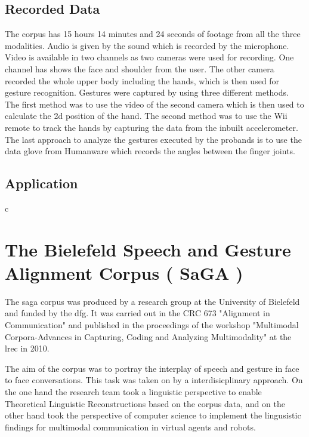 \documentclass[a4paper]{article}
\begin{document}
		\subsection{Recorded Data}
			The corpus has 15 hours 14 minutes and 24 seconds of footage from all the three modalities. Audio is given by the sound which is recorded by the microphone. Video is available in two channels as two cameras were used for recording. One channel has shows the face and shoulder from the user. The other camera recorded the whole upper body including the hands, which is then used for gesture recognition. Gestures were captured by using three different methods. The first method was to use the video of the second camera which is then used to calculate the 2d position of the hand. The second method was to use the Wii remote to track the hands by capturing the data from the inbuilt accelerometer. The last approach to analyze the gestures executed by the probands is to use the data glove from Humanware which records the angles between the finger joints.
		\subsection{Application}
			c
	
	\section{The Bielefeld Speech and Gesture Alignment Corpus ( SaGA )}
		The \gls{saga} corpus was produced by a research group at the University of Bielefeld and funded by the \gls{dfg}. It was carried out in the CRC 673 "Alignment in Communication" and published in the proceedings of the workshop "Multimodal Corpora-Advances in Capturing, Coding and Analyzing Multimodality" at the \gls{lrec} in 2010.
		
		The aim of the corpus was to portray the interplay of speech and gesture in face to face conversations. This task was taken on by a interdisicplinary approach. On the one hand the research team took a linguistic perspective to enable Theoretical Linguistic Reconstructions based on the corpus data, and on the other hand took the perspective of computer science to implement the lingusistic findings for multimodal communication in virtual agents and robots. \cite[ch. 1]{Bielefeld2010}
	
\end{document}
